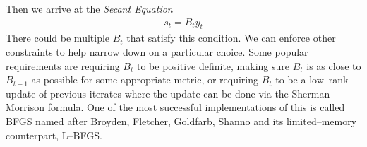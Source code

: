  Then we arrive at the \emph{Secant Equation}
 \begin{align*}
     s_t = B_{t} y_t
 \end{align*}
 There could be multiple $B_t$ that satisfy this condition. We can enforce other constraints to help narrow down on a particular choice. Some popular requirements are requiring $B_t$ to be positive definite, making sure $B_t$ is as close to $B_{t-1}$ as possible for some appropriate metric, or requiring $B_t$ to be a low--rank update of previous iterates where the update can be done via the Sherman--Morrison formula.  One of the most successful implementations of this is called BFGS named after Broyden, Fletcher, Goldfarb, Shanno and its limited--memory counterpart, L--BFGS.